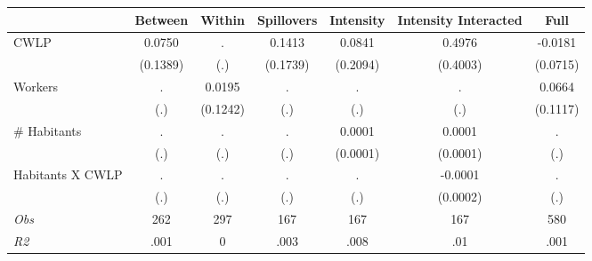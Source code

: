 \begin{tabular}{l*{6}{c}}\hline&\multicolumn{1}{c}{Between}&\multicolumn{1}{c}{Within}&\multicolumn{1}{c}{Spillovers}&\multicolumn{1}{c}{Intensity}&\multicolumn{1}{c}{Intensity Interacted}&\multicolumn{1}{c}{Full}\\ \hline 
CWLP & 0.0750 & . & 0.1413 & 0.0841 & 0.4976 & -0.0181 \\
 & (0.1389) & (.) & (0.1739) & (0.2094) & (0.4003) & (0.0715) \\
Workers & . & 0.0195 & . & . & . & 0.0664 \\
 & (.) & (0.1242) & (.) & (.) & (.) & (0.1117) \\
\# Habitants & . & . & . & 0.0001 & 0.0001 & . \\
 & (.) & (.) & (.) & (0.0001) & (0.0001) & (.) \\
Habitants X CWLP & . & . & . & . & -0.0001 & . \\
 & (.) & (.) & (.) & (.) & (0.0002) & (.) \\
\hline \textit{Obs} & 262 & 297 & 167 & 167 & 167 & 580 \\ \textit{R2} & .001 & 0 & .003 & .008 & .01 & .001 \\ \hline \end{tabular}
